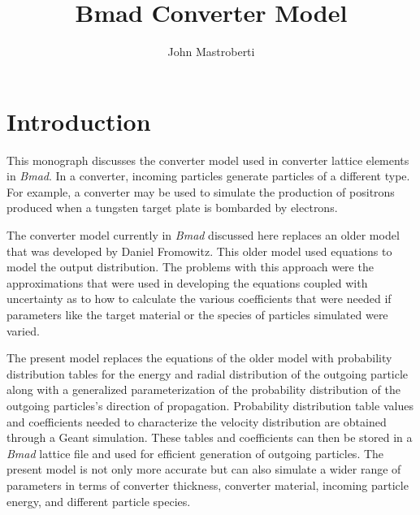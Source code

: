 \documentclass[12pt]{article}
\begin{document}
\title{Bmad Converter Model}
\author{John Mastroberti}

\maketitle

\newcommand{\dxds}{\frac{dx}{ds}}
\newcommand{\dyds}{\frac{dy}{ds}}
\newcommand{\dxdsmin}{\dxds_{\mathrm{min}}}
\newcommand{\dxdsmax}{\dxds_{\mathrm{max}}}
\newcommand{\dydsmax}{\left| \dyds \right|_{\mathrm{max}}}
\newcommand{\exes}{\texttt{converter\_simulation}\xspace}
\newcommand{\exef}{\texttt{converter\_fitter}\xspace}
\newcommand{\configfile}{\texttt{config.txt}\xspace}
\newcommand{\bmad}{\textit{Bmad}\xspace}

\tableofcontents

\newpage

\section{Introduction}

This monograph discusses the converter model used in converter lattice elements in \bmad. In a
converter, incoming particles generate particles of a different type. For example, a converter may
be used to simulate the production of positrons produced when a tungsten target plate is bombarded
by electrons.

The converter model currently in \bmad discussed here replaces an older model that was developed by
Daniel Fromowitz\cite{b:fromowitz}. This older model used equations to model the output
distribution.  The problems with this approach were the approximations that were used in developing
the equations coupled with uncertainty as to how to calculate the various coefficients that were
needed if parameters like the target material or the species of particles simulated were varied.

The present model replaces the equations of the older model with probability distribution tables for
the energy and radial distribution of the outgoing particle along with a generalized
parameterization of the probability distribution of the outgoing particles's direction of
propagation.  Probability distribution table values and coefficients needed to characterize the
velocity distribution are obtained through a Geant\cite{geant} simulation. These tables and
coefficients can then be stored in a \bmad lattice file and used for efficient generation of
outgoing particles. The present model is not only more accurate but can also simulate a wider range
of parameters in terms of converter thickness, converter material, incoming particle energy, and
different particle species.
\end{document}
